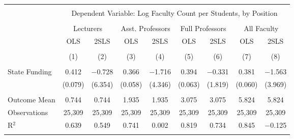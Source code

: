 
\begin{tabular}{@{\extracolsep{5pt}}lcccccccc} 
\\[-1.8ex]\hline 
\hline \\[-1.8ex] 
 & \multicolumn{8}{c}{Dependent Variable: Log Faculty Count per Students, by Position} \\ 
\cline{2-9} 
\\[-1.8ex] & \multicolumn{2}{c}{Lecturers} & \multicolumn{2}{c}{Asst. Professors} & \multicolumn{2}{c}{Full Professors} & \multicolumn{2}{c}{All Faculty} \\ 
 & OLS & 2SLS & OLS & 2SLS & OLS & 2SLS & OLS & 2SLS \\ 
\\[-1.8ex] & (1) & (2) & (3) & (4) & (5) & (6) & (7) & (8)\\ 
\hline \\[-1.8ex] 
 State Funding & 0.412 & $-$0.728 & 0.366 & $-$1.716 & 0.394 & $-$0.331 & 0.381 & $-$1.563 \\ 
  & (0.079) & (6.354) & (0.058) & (4.346) & (0.063) & (1.819) & (0.060) & (3.969) \\ 
 \hline \\[-1.8ex] 
Outcome Mean & 0.744 & 0.744 & 1.935 & 1.935 & 3.075 & 3.075 & 5.824 & 5.824 \\ 
Observations & 25,309 & 25,309 & 25,309 & 25,309 & 25,309 & 25,309 & 25,309 & 25,309 \\ 
R$^{2}$ & 0.639 & 0.549 & 0.741 & 0.002 & 0.819 & 0.734 & 0.845 & $-$0.125 \\ 
\hline 
\hline \\[-1.8ex] 
\end{tabular} 
